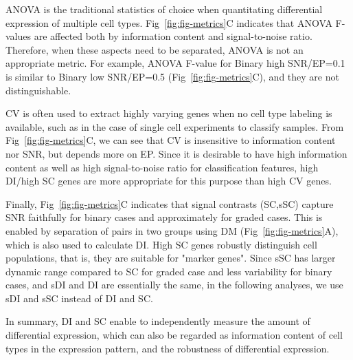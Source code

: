 ANOVA is the traditional statistics of choice when quantitating differential expression of multiple cell types. Fig~\ref{fig:fig-metrics}C indicates that ANOVA F-values are affected both by information content and signal-to-noise ratio. Therefore, when these aspects need to be separated, ANOVA is not an appropriate metric. For example, ANOVA F-value for Binary high SNR/EP=0.1 is similar to Binary low SNR/EP=0.5 (Fig~\ref{fig:fig-metrics}C), and they are not distinguishable. 

CV is often used to extract highly varying genes when no cell type labeling is available, such as in the case of single cell experiments to classify samples. From Fig~\ref{fig:fig-metrics}C, we can see that CV is insensitive to information content nor SNR, but depends more on EP. Since it is desirable to have high information content as well as high signal-to-noise ratio for classification features, high DI/high SC genes are more appropriate for this purpose than high CV genes. 
% 
% 

Finally, Fig~\ref{fig:fig-metrics}C indicates that signal contrasts (SC,sSC) capture SNR faithfully for binary cases and approximately for graded cases. This is enabled by separation of pairs in two groups using DM (Fig~\ref{fig:fig-metrics}A), which is also used to calculate DI. High SC genes robustly distinguish cell populations, that is, they are suitable for "marker genes". Since sSC has larger dynamic range compared to SC for graded case and less variability for binary cases, and sDI and DI are essentially the same, in the following analyses, we use sDI and sSC instead of DI and SC.

In summary, DI and SC enable to independently measure the amount of differential expression, which can also be regarded as information content of cell types in the expression pattern, and the robustness of differential expression.